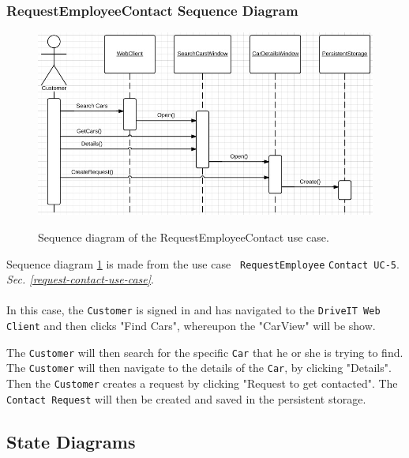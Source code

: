 \subsubsection{RequestEmployeeContact Sequence Diagram}
\begin{figure}[H]
	\centering
		\includegraphics[width=\textwidth]{Figures/SequenceDiagram-RequestEmployeeContact}\\
	\caption{Sequence diagram of the RequestEmployeeContact use case.}
  \label{fig:SequenceDiagram-RequestEmployeeContact}
\end{figure}

Sequence diagram \ref{fig:SequenceDiagram-RequestEmployeeContact} is made from the use case \texttt{ RequestEmployee} \texttt{Contact UC-5}. \textit{Sec. \ref{request-contact-use-case}}. \\\\
In this case, the \texttt{Customer} is signed in and has navigated to the \texttt{DriveIT Web Client} and then clicks "Find Cars", whereupon the "CarView" will be show. 

The \texttt{Customer} will then search for the specific \texttt{Car} that he or she is trying to find. The \texttt{Customer} will then navigate to the details of the \texttt{Car}, by clicking "Details". Then the \texttt{Customer} creates a request by clicking "Request to get contacted". The \texttt{Contact Request} will then be created and saved in the persistent storage.

\subsection{State Diagrams}
